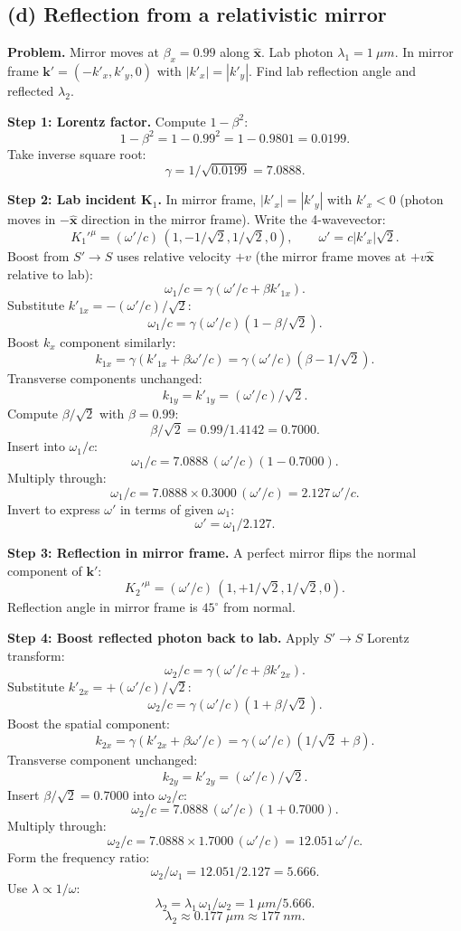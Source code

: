 \documentclass[11pt]{article}
\begin{document}
\subsection*{(d) Reflection from a relativistic mirror}

\textbf{Problem.} Mirror moves at $\beta_x=0.99$ along $\hat{\bm x}$. Lab photon $\lambda_1=\SI{1}{\mu m}$. In mirror frame $\bm k'=(-k'_x,k'_y,0)$ with $|k'_x|=|k'_y|$. Find lab reflection angle and reflected $\lambda_2$.

\noindent\textbf{Step 1: Lorentz factor.} Compute $1-\beta^2$:
\[ 1-\beta^2 = 1-0.99^2 = 1-0.9801 = 0.0199. \]
Take inverse square root:
\[ \gamma = 1/\sqrt{0.0199} = 7.0888. \]

\noindent\textbf{Step 2: Lab incident $\bm K_1$.} In mirror frame, $|k'_x|=|k'_y|$ with $k'_x<0$ (photon moves in $-\hat{\bm x}$ direction in the mirror frame). Write the 4-wavevector:
\[ K_1'^\mu = (\omega'/c)\,(1,-1/\sqrt{2},1/\sqrt{2},0),\qquad \omega' = c|k'_x|\sqrt{2}. \]
Boost from $S'\to S$ uses relative velocity $+v$ (the mirror frame moves at $+v\hat{\bm x}$ relative to lab):
\[ \omega_1/c = \gamma(\omega'/c + \beta k'_{1x}). \]
Substitute $k'_{1x}=-(\omega'/c)/\sqrt 2$:
\[ \omega_1/c = \gamma(\omega'/c)(1-\beta/\sqrt{2}). \]
Boost $k_x$ component similarly:
\[ k_{1x} = \gamma(k'_{1x} + \beta\omega'/c) = \gamma(\omega'/c)(\beta - 1/\sqrt{2}). \]
Transverse components unchanged:
\[ k_{1y} = k'_{1y} = (\omega'/c)/\sqrt{2}. \]
Compute $\beta/\sqrt 2$ with $\beta=0.99$:
\[ \beta/\sqrt 2 = 0.99/1.4142 = 0.7000. \]
Insert into $\omega_1/c$:
\[ \omega_1/c = 7.0888\,(\omega'/c)(1-0.7000). \]
Multiply through:
\[ \omega_1/c = 7.0888\times 0.3000\,(\omega'/c) = 2.127\,\omega'/c. \]
Invert to express $\omega'$ in terms of given $\omega_1$:
\[ \omega' = \omega_1/2.127. \]

\noindent\textbf{Step 3: Reflection in mirror frame.} A perfect mirror flips the normal component of $\bm k'$:
\[ K_2'^\mu = (\omega'/c)\,(1,+1/\sqrt 2,1/\sqrt 2,0). \]
Reflection angle in mirror frame is $45^\circ$ from normal.

\noindent\textbf{Step 4: Boost reflected photon back to lab.} Apply $S'\to S$ Lorentz transform:
\[ \omega_2/c = \gamma(\omega'/c + \beta k'_{2x}). \]
Substitute $k'_{2x}=+(\omega'/c)/\sqrt 2$:
\[ \omega_2/c = \gamma(\omega'/c)(1+\beta/\sqrt 2). \]
Boost the spatial component:
\[ k_{2x} = \gamma(k'_{2x} + \beta\omega'/c) = \gamma(\omega'/c)(1/\sqrt 2 + \beta). \]
Transverse component unchanged:
\[ k_{2y} = k'_{2y} = (\omega'/c)/\sqrt 2. \]
Insert $\beta/\sqrt 2 = 0.7000$ into $\omega_2/c$:
\[ \omega_2/c = 7.0888\,(\omega'/c)(1+0.7000). \]
Multiply through:
\[ \omega_2/c = 7.0888\times 1.7000\,(\omega'/c) = 12.051\,\omega'/c. \]
Form the frequency ratio:
\[ \omega_2/\omega_1 = 12.051/2.127 = 5.666. \]
Use $\lambda \propto 1/\omega$:
\[ \lambda_2 = \lambda_1\,\omega_1/\omega_2 = \SI{1}{\mu m}/5.666. \]
\[ \boxed{\;\lambda_2 \approx \SI{0.177}{\mu m} \approx \SI{177}{nm}.\;} \]
\end{document}

